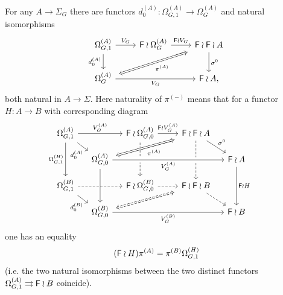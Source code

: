 \documentclass[a4paper,10pt]{article}%
\begin{document}
\begin{proposition}
  For any $A \to \Sigma_G$ there are functors 
  $d_0^{(A)}\colon \Omega_{G,1}^{(A)} \to \Omega_{G}^{(A)}$ and natural isomorphisms
  \begin{equation}\label{SHUFFLEPERMA EQ}
    \begin{tikzcd}
      \Omega_{G,1}^{(A)} \ar{r}{V_G} \ar{d}[swap]{d_{0}^{(A)}}&
      \Fin \wr \Omega_{G}^{(A)} \ar{r}{\Fin \wr V_G} &
      |[alias=FFOmega]|\Fin \wr \Fin \wr A \ar{d}{\sigma^0}
      \\
      |[alias=Omega]|\Omega_{G}^{(A)} \ar{rr}[swap]{V_G} &&
      \Fin \wr A,
      \arrow[Leftrightarrow, from=FFOmega, to=Omega,shorten <=0.15cm,,shorten >=0.15cm,"\pi^{(A)}"]
    \end{tikzcd}
  \end{equation}
  both natural in $A \to \Sigma$.
  Here naturality of $\pi^{(\minus)}$ means that for a functor $H \colon A \to B$ with corresponding diagram
  \begin{equation}\label{PICUBOIDAB EQ}
    \begin{tikzcd}[column sep = small, row sep = small]
      \Omega_{G,1}^{(A)} \ar{rr}{V_G^{(A)}} \ar{rd}[swap,near end]{d^{(A)}_0} \ar{dd}[swap]{\Omega_{G,1}^{(H)}}
      &&
      \Fin \wr \Omega_{G,0}^{(A)} \ar{rr}{\Fin \wr V_G^{(A)}} \ar[dd,dashed]&&
      |[alias=FFOmegan]|\Fin \wr \Fin \wr A  \ar[dd,dashed] \ar{rd}{\sigma^0}
      \\
      &
      |[alias=Omeganp1]|\Omega_{G,0}^{(A)} \ar[crossing over]{rrrr}[swap]{V_G^{(A)}} \ar[crossing over]{dd} &&&&
      \Fin \wr A \ar{dd}{\Fin \wr H}&
      \\
      \Omega_{G,1}^{(B)} \ar[dashed]{rr} \ar{rd}[swap,near end]{d^{(B)}_0}&&
      \Fin \wr \Omega^{(B)}_{G,0} \ar[rr,dashed] &&
      |[alias=FFOmeganm1]|\Fin \wr \Fin \wr B \ar[rd,dashed] 
      \\
      &
      |[alias=Omegan]|\Omega^{(B)}_{G,0} \ar{rrrr}[swap]{V_G^{(B)}} &&&&
      \Fin \wr B &
      \arrow[Leftrightarrow, from=Omeganp1, to=FFOmegan,shorten <=0.15cm,shorten >=0.15cm,swap,"\pi^{(A)}"]
      \arrow[Leftrightarrow, from=FFOmeganm1, to=Omegan,shorten <=0.15cm,shorten >=0.15cm,dashed]
    \end{tikzcd}
  \end{equation}
  one has an equality 
  \[(\mathsf{F} \wr H)\pi^{(A)} = \pi^{(B)}\Omega_{G,1}^{(H)}\]
  (i.e. the two natural isomorphisms between the two distinct functors $\Omega_{G,1}^{(A)} \rightrightarrows \mathsf{F} \wr B$ coincide).
\end{proposition}
\end{document}
